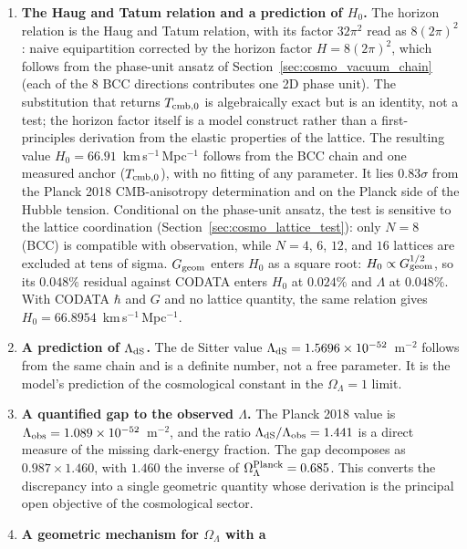 \documentclass[10pt,a4paper]{article}
\begin{document}
\begin{enumerate}
	\item \textbf{The Haug and Tatum relation and a prediction of
		\(H_0\).} The horizon relation is the Haug and Tatum relation,
	with its factor $32\pi^2$ read as $8(2\pi)^2$: naive equipartition
	corrected by the
	horizon factor \(H = 8(2\pi)^2\), which follows from the
	phase-unit ansatz of Section~\ref{sec:cosmo_vacuum_chain}
	(each of the 8 BCC directions contributes one 2D phase unit).
	The substitution that returns \(T_{\rm cmb,0}\) is algebraically
	exact but is an identity, not a test; the horizon factor itself
	is a model construct rather than a first-principles derivation
	from the elastic properties of the lattice. The
	resulting value \(H_0 = 66.91\)~km\,s\(^{-1}\)\,Mpc\(^{-1}\)
	follows from the BCC chain and one measured anchor
	(\(T_{\rm cmb,0}\)), with no fitting of any parameter. It lies
	\(0.83\sigma\) from the Planck 2018 CMB-anisotropy
	determination and on the Planck side of the Hubble tension.
	Conditional on the phase-unit ansatz, the test is sensitive to
	the lattice coordination
	(Section~\ref{sec:cosmo_lattice_test}): only \(N=8\) (BCC) is
	compatible with observation, while \(N=4\), \(6\), \(12\), and
	\(16\) lattices are excluded at tens of sigma.
	\(G_{\rm geom}\) enters \(H_0\) as a square root: \(H_0 \propto G_{\rm geom}^{1/2}\),
	so its $0.048\%$ residual against CODATA enters \(H_0\) at $0.024\%$
	and \(\Lambda\) at $0.048\%$. With CODATA \(\hbar\) and \(G\) and no
	lattice quantity, the same relation gives $H_0 = 66.8954$~km\,s$^{-1}$\,Mpc$^{-1}$.
	\item \textbf{A prediction of \(\Lambda_{\rm dS}\).} The de
	Sitter value \(\Lambda_{\rm dS} = 1.5696\times 10^{-52}\)~m\(^{-2}\)
	follows from the same chain and is a definite number, not a
	free parameter. It is the model's prediction of the
	cosmological constant in the \(\Omega_\Lambda = 1\) limit.
	\item \textbf{A quantified gap to the observed \(\Lambda\).} The
	Planck 2018 value is
	\(\Lambda_{\rm obs} = 1.089\times 10^{-52}\)~m\(^{-2}\), and
	the ratio \(\Lambda_{\rm dS}/\Lambda_{\rm obs} = 1.441\) is a
	direct measure of the missing dark-energy fraction. The gap
	decomposes as \(0.987 \times 1.460\), with \(1.460\) the
	inverse of \(\Omega_\Lambda^{\rm Planck} = 0.685\). This
	converts the discrepancy into a single geometric quantity
	whose derivation is the principal open objective of the
	cosmological sector.
	\item \textbf{A geometric mechanism for \(\Omega_\Lambda\) with a
}
\end{enumerate}
\end{document}
